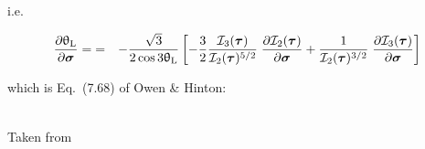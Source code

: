 i.e.
\begin{mdframed}[backgroundcolor=blue!5]
\begin{eqnarray}
\frac{\partial \uptheta_{\rm L}}{\partial \bm\sigma}
=
&=&
-\frac{\sqrt{3}}{2\cos 3\uptheta_{\rm L}}
\left[
-\frac32  \frac{ {\cal I}_3(\bm\tau)   }{ {\cal I}_2(\bm\tau)^{5/2}}
\; \frac{\partial {\cal I}_2(\bm\tau)}{\partial \bm\sigma} 
+  \frac{1}{{\cal I}_2(\bm\tau)^{3/2}} 
\; \frac{\partial  {\cal I}_3(\bm\tau)}{\partial \bm\sigma} 
\right]
\end{eqnarray}
\end{mdframed}
which is Eq.~(7.68) of Owen \& Hinton:
\begin{center}
\\
{\captionfont Taken from \textcite{owhi}}
\end{center}


